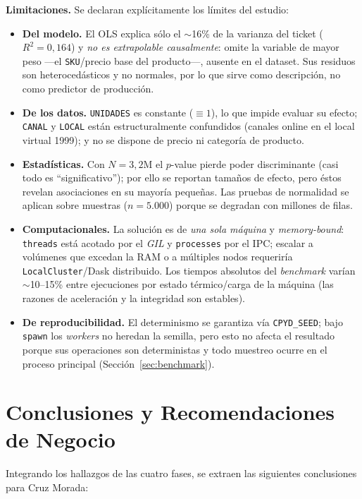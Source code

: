 \documentclass[12pt,letterpaper]{article}
\begin{document}
\textbf{Limitaciones.} Se declaran explícitamente los límites del estudio:
\begin{itemize}
    \item \textbf{Del modelo.} El OLS explica sólo el $\sim$16\% de la varianza del ticket
    ($R^2=0{,}164$) y \textit{no es extrapolable causalmente}: omite la variable de mayor peso —el
    \texttt{SKU}/precio base del producto—, ausente en el dataset. Sus residuos son heterocedásticos
    y no normales, por lo que sirve como descripción, no como predictor de producción.
    \item \textbf{De los datos.} \texttt{UNIDADES} es constante ($\equiv 1$), lo que impide evaluar
    su efecto; \texttt{CANAL} y \texttt{LOCAL} están estructuralmente confundidos (canales online en
    el local virtual 1999); y no se dispone de precio ni categoría de producto.
    \item \textbf{Estadísticas.} Con $N=3{,}2$M el $p$-value pierde poder discriminante (casi todo es
    ``significativo''); por ello se reportan tamaños de efecto, pero éstos revelan asociaciones en su
    mayoría pequeñas. Las pruebas de normalidad se aplican sobre muestras ($n=5.000$) porque se
    degradan con millones de filas.
    \item \textbf{Computacionales.} La solución es de \textit{una sola máquina} y \textit{memory-bound}:
    \texttt{threads} está acotado por el \textit{GIL} y \texttt{processes} por el IPC; escalar a
    volúmenes que excedan la RAM o a múltiples nodos requeriría \texttt{LocalCluster}/Dask distribuido.
    Los tiempos absolutos del \textit{benchmark} varían $\sim$10--15\% entre ejecuciones por estado
    térmico/carga de la máquina (las razones de aceleración y la integridad son estables).
    \item \textbf{De reproducibilidad.} El determinismo se garantiza vía \texttt{CPYD\_SEED}; bajo
    \texttt{spawn} los \textit{workers} no heredan la semilla, pero esto no afecta el resultado porque
    sus operaciones son deterministas y todo muestreo ocurre en el proceso principal (Sección~\ref{sec:benchmark}).
\end{itemize}

\section{Conclusiones y Recomendaciones de Negocio}
\label{sec:conclusiones}
Integrando los hallazgos de las cuatro fases, se extraen las siguientes conclusiones para Cruz Morada:
\end{document}

